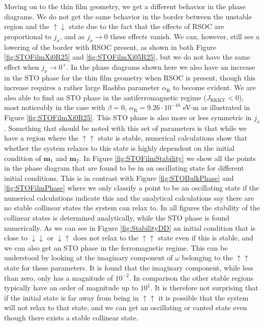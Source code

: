 Moving on to the thin film geometry, we get a different behavior in the phase diagrams. We do not get the same behavior in the border between the unstable region and the $\uparrow\downarrow$ state due to the fact that the effects of RSOC are proportional to $j_x$, and as $j_x\rightarrow 0$ these effects vanish. We can, however, still see a lowering of the border with RSOC present, as shown in both Figure \ref{fig:STOFilmXi0R25} and \ref{fig:STOFilmXi05R25}, but we do not have the same effect when $j_x\rightarrow 0^+$. In the phase diagrams shown here we also have an increase in the STO phase for the thin film geometry when RSOC is present, though this increase requires a rather large Rashba parameter $\alpha_{\text{R}}$ to become evident. We are also able to find an STO phase in the antiferromagnetic regime ($J_{\text{RKKY}}<0$), most noticeably in the case with $\beta = 0$, $\alpha_\text{R} = 9.26\cdot10^{-10}$ eV$\cdot$m as illustrated in Figure \ref{fig:STOFilmXi0R25}. This STO phase is also more or less symmetric in $j_x$. Something that should be noted with this set of parameters is that while we have a region where the $\uparrow\uparrow$ state is stable, numerical calculations show that whether the system relaxes to this state is highly dependent on the initial condition of $\mathbold{m}_1$ and $\mathbold{m}_2$. In Figure \ref{fig:STOFilmStability} we show all the points in the phase diagram that are found to be in an oscillating state for different initial conditions. This is in contrast with Figure \ref{fig:STOBulkPhase} and \ref{fig:STOFilmPhase} where we only classify a point to be an oscillating state if the numerical calculations indicate this and the analytical calculations say there are no stable collinear states the system can relax to. In all figures the stability of the collinear states is determined analytically, while the STO phase is found numerically. As we can see in Figure \ref{fig:StabilityDD} an initial condition that is close to $\downarrow\downarrow$ or $\downarrow\uparrow$ does not relax to the $\uparrow\uparrow$ state even if this is stable, and we can also get an STO phase in the ferromagnetic regime. This can be understood by looking at the imaginary component of $\omega$ belonging to the $\uparrow\uparrow$ state for these parameters. It is found that the imaginary component, while less than zero, only has a magnitude of $10^{-2}$. In comparison the other stable regions typically have an order of magnitude up to $10^1$. It is therefore not surprising that if the initial state is far away from being in $\uparrow\uparrow$ it is possible that the system will not relax to that state, and we can get an oscillating or canted state even though there exists a stable collinear state.

